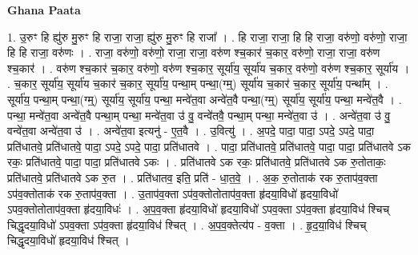 \documentclass[17pt]{extarticle}
\begin{document}
\textbf{Ghana Paata } \newline

1. उ॒रुꣳ हि ह्यु॑रु मु॒रुꣳ हि राजा॒ राजा॒ ह्यु॑रु मु॒रुꣳ हि राजा᳚ । . हि राजा॒ राजा॒ हि हि राजा॒ वरु॑णो॒ वरु॑णो॒ राजा॒ हि हि राजा॒ वरु॑णः । . राजा॒ वरु॑णो॒ वरु॑णो॒ राजा॒ राजा॒ वरु॑ण श्च॒कार॑ च॒कार॒ वरु॑णो॒ राजा॒ राजा॒ वरु॑ण श्च॒कार॑ । . वरु॑ण श्च॒कार॑ च॒कार॒ वरु॑णो॒ वरु॑ण श्च॒कार॒ सूर्या॑य॒ सूर्या॑य च॒कार॒ वरु॑णो॒ वरु॑ण श्च॒कार॒ सूर्या॑य । . च॒कार॒ सूर्या॑य॒ सूर्या॑य च॒कार॑ च॒कार॒ सूर्या॑य॒ पन्था॒म् पन्था॒(ग्म्॒) सूर्या॑य च॒कार॑ च॒कार॒ सूर्या॑य॒ पन्था᳚म् । . सूर्या॑य॒ पन्था॒म् पन्था॒(ग्म्॒) सूर्या॑य॒ सूर्या॑य॒ पन्था॒ मन्वे॑त॒वा अन्वे॑त॒वै पन्था॒(ग्म्॒) सूर्या॑य॒ सूर्या॑य॒ पन्था॒ मन्वे॑त॒वै । . पन्था॒ मन्वे॑त॒वा अन्वे॑त॒वै पन्था॒म् पन्था॒ मन्वे॑त॒वा उ॑ वु॒ वन्वे॑तवै॒ पन्था॒म् पन्था॒ मन्वे॑त॒वा उ॑ । . अन्वे॑त॒वा उ॑ वु॒ वन्वे॑त॒वा अन्वे॑त॒वा उ॑ । . अन्वे॑त॒वा इत्यनु॑ - ए॒त॒वै । . उ॒वित्यु॑ । . अ॒पदे॒ पादा॒ पादा॒ ऽपदे॒ ऽपदे॒ पादा॒ प्रति॑धातवे॒ प्रति॑धातवे॒ पादा॒ ऽपदे॒ ऽपदे॒ पादा॒ प्रति॑धातवे । . पादा॒ प्रति॑धातवे॒ प्रति॑धातवे॒ पादा॒ पादा॒ प्रति॑धातवे ऽक रकः॒ प्रति॑धातवे॒ पादा॒ पादा॒ प्रति॑धातवे ऽकः । . प्रति॑धातवे ऽक रकः॒ प्रति॑धातवे॒ प्रति॑धातवे ऽक रु॒तोताकः॒ प्रति॑धातवे॒ प्रति॑धातवे ऽक रु॒त । . प्रति॑धातव॒ इति॒ प्रति॑ - धा॒त॒वे॒ । . अ॒क॒ रु॒तोताक॑ रक रु॒ताप॑व॒क्ता ऽप॑व॒क्तोताक॑ रक रु॒ताप॑व॒क्ता । . उ॒ताप॑व॒क्ता ऽप॑व॒क्तोतोताप॑व॒क्ता हृ॑दया॒विधो॑ हृदया॒विधो॑ ऽपव॒क्तोतोताप॑व॒क्ता हृ॑दया॒विधः॑ । . अ॒प॒व॒क्ता हृ॑दया॒विधो॑ हृदया॒विधो॑ ऽपव॒क्ता ऽप॑व॒क्ता हृ॑दया॒विध॑ श्चिच् चिद्धृदया॒विधो॑ ऽपव॒क्ता ऽप॑व॒क्ता हृ॑दया॒विध॑ श्चित् । . अ॒प॒व॒क्तेत्य॑प - व॒क्ता । . हृ॒द॒या॒विध॑ श्चिच् चिद्धृदया॒विधो॑ हृदया॒विध॑ श्चित् । \newline
\end{document}
